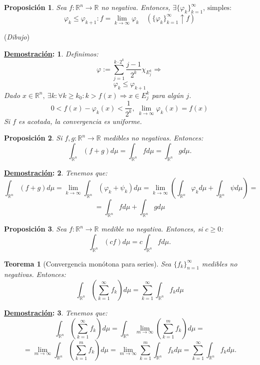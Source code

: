 \documentclass[10pt,a4paper,openright]{book}
\theoremstyle{break}
\newtheorem*{theo}{Teorema}
\newtheorem*{prop}{Proposición}
\newtheorem*{demo}{\underline{Demostración}:}
\begin{document}
\begin{prop}
Sea $f: \mathbb{R}^n \rightarrow \mathbb{R}$ no negativa. Entonces,
$\exists \{\varphi_k\}_{k=1}^{\infty} \text{, simples} :$
$$\varphi_k \le \varphi_{k+1} : f = \lim_{k \rightarrow \infty}\varphi_k \quad \left(\{\varphi_k\}_{k=1}^{\infty}\uparrow f\right)$$
\end{prop}
(\textit{Dibujo}) 
\begin{demo}
Definimos:
$$\varphi := \sum_{j=1}^{k\cdot 2^k} \frac{j-1}{2^k} \chi_{E_j^k} \Rightarrow$$
$$\varphi_k \le \varphi_{k+1}$$
Dado $x \in \mathbb{R}^n,\ \exists k : \forall k \ge k_0: k > f\left(x\right) \Rightarrow x \in E_j^k$ para algún $j $.
$$0 < f\left(x \right) - \varphi_k \left(x\right) < \frac{1}{2^k},\ \lim_{k \rightarrow \infty} \varphi_k\left(x\right) = f\left(x\right) $$
Si $f$ es acotada, la convergencia es uniforme.
\end{demo}

\begin{prop}
Si $f, g: \mathbb{R}^n \rightarrow \mathbb{R}$ medibles no negativas. Entonces:
$$\int_{\mathbb{R}^n} \left(f + g\right)d \mu = \int_{\mathbb{R}^n} f d \mu = \int_{\mathbb{R}^n} g d \mu.$$
\end{prop}
\begin{demo}
Tenemos que:
$$\int_{\mathbb{R}^n} \left(f + g\right) d \mu = \lim_{k \rightarrow \infty} \int_{\mathbb{R}^n} \left(\varphi_k + \psi_k\right) d \mu = \lim_{k \rightarrow \infty} \left( \int_{\mathbb{R}^n} \varphi_k d \mu + \int_{\mathbb{R}^n} \psi d \mu \right) = $$
$$= \int_{\mathbb{R}^n} f d \mu + \int_{\mathbb{R}^n} g d \mu$$
\end{demo}

\begin{prop}
Sea $f: \mathbb{R}^n \rightarrow \mathbb{R}$ medible no negativa. Entonces, si $c \ge 0$: 
$$\int_{\mathbb{R}^n} \left(c f\right) d \mu = c \int_{\mathbb{R}^n}f d \mu.$$
\end{prop}

\begin{theo}[Convergencia monótona para series]
Sea $\{f_k\}_{n=1}^{\infty}$ medibles no negativas. Entonces: 
$$\int_{\mathbb{R}^n} \left(\sum_{k=1}^{\infty} f_k \right) d \mu = \sum_{k=1}^{\infty} \int_{\mathbb{R}^n} f_k d \mu$$
\end{theo}
\begin{demo}
Tenemos que:
$$\int_{\mathbb{R}^n} \left(\sum_{k=1}^{\infty} f_k\right) d \mu = \int_{\mathbb{R}^n} \lim_{m \rightarrow \infty} \left(\sum_{k=1}^{m} f_k \right)d \mu = $$
$$= \lim_{m \rightarrow \infty}\int_{\mathbb{R}^n} \left(\sum_{k=1}^{m} f_k\right) d \mu = \lim_{m \rightarrow \infty} \sum_{k=1}^{m} \int_{\mathbb{R}^n} f_k d \mu = \sum_{k=1}^{\infty} \int_{\mathbb{R}^n} f_k d \mu. $$
\end{demo}
\end{document}
